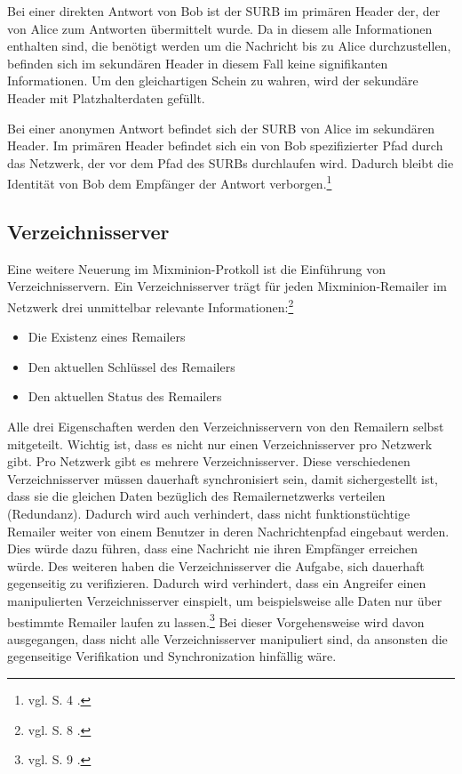 Bei einer direkten Antwort von Bob ist der SURB im primären Header der, der von Alice zum Antworten übermittelt wurde. Da in diesem alle Informationen enthalten sind, die benötigt werden um die Nachricht bis zu Alice durchzustellen, befinden sich im sekundären Header in diesem Fall keine signifikanten Informationen. Um den gleichartigen Schein zu wahren, wird der sekundäre Header mit Platzhalterdaten gefüllt.

Bei einer anonymen Antwort befindet sich der SURB von Alice im sekundären Header. Im primären Header befindet sich ein von Bob spezifizierter Pfad durch das Netzwerk, der vor dem Pfad des SURBs durchlaufen wird. Dadurch bleibt die Identität von Bob dem Empfänger der Antwort verborgen.\footnote{vgl. S. 4 \cite{mixminion}.}

\subsection{Verzeichnisserver}
Eine weitere Neuerung im Mixminion-Protkoll ist die Einführung von Verzeichnisservern. Ein Verzeichnisserver trägt für jeden Mixminion-Remailer im Netzwerk drei unmittelbar relevante Informationen:\footnote{vgl. S. 8 \cite{mixminion}.}
\begin{itemize}
\item Die Existenz eines Remailers
\item Den aktuellen Schlüssel des Remailers
\item Den aktuellen Status des Remailers
\end{itemize}

Alle drei Eigenschaften werden den Verzeichnisservern von den Remailern selbst mitgeteilt.
Wichtig ist, dass es nicht nur einen Verzeichnisserver pro Netzwerk gibt. Pro Netzwerk gibt es mehrere Verzeichnisserver. Diese verschiedenen Verzeichnisserver müssen dauerhaft synchronisiert sein, damit sichergestellt ist, dass sie die gleichen Daten bezüglich des Remailernetzwerks verteilen (Redundanz). Dadurch wird auch verhindert, dass nicht funktionstüchtige Remailer weiter von einem Benutzer in deren Nachrichtenpfad eingebaut werden. Dies würde dazu führen, dass eine Nachricht nie ihren Empfänger erreichen würde. Des weiteren haben die Verzeichnisserver die Aufgabe, sich dauerhaft gegenseitig zu verifizieren. Dadurch wird verhindert, dass ein Angreifer einen manipulierten Verzeichnisserver einspielt, um beispielsweise alle Daten nur über bestimmte Remailer laufen zu lassen.\footnote{vgl. S. 9 \cite{mixminion}.} Bei dieser Vorgehensweise wird davon ausgegangen, dass nicht alle Verzeichnisserver manipuliert sind, da ansonsten die gegenseitige Verifikation und Synchronization hinfällig wäre.

